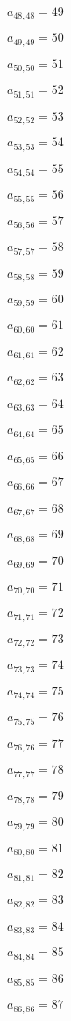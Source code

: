\documentclass[a4paper,12pt]{article}
\begin{document}
$a _{ 48, 48 } = 49$

$a _{ 49, 49 } = 50$

$a _{ 50, 50 } = 51$

$a _{ 51, 51 } = 52$

$a _{ 52, 52 } = 53$

$a _{ 53, 53 } = 54$

$a _{ 54, 54 } = 55$

$a _{ 55, 55 } = 56$

$a _{ 56, 56 } = 57$

$a _{ 57, 57 } = 58$

$a _{ 58, 58 } = 59$

$a _{ 59, 59 } = 60$

$a _{ 60, 60 } = 61$

$a _{ 61, 61 } = 62$

$a _{ 62, 62 } = 63$

$a _{ 63, 63 } = 64$

$a _{ 64, 64 } = 65$

$a _{ 65, 65 } = 66$

$a _{ 66, 66 } = 67$

$a _{ 67, 67 } = 68$

$a _{ 68, 68 } = 69$

$a _{ 69, 69 } = 70$

$a _{ 70, 70 } = 71$

$a _{ 71, 71 } = 72$

$a _{ 72, 72 } = 73$

$a _{ 73, 73 } = 74$

$a _{ 74, 74 } = 75$

$a _{ 75, 75 } = 76$

$a _{ 76, 76 } = 77$

$a _{ 77, 77 } = 78$

$a _{ 78, 78 } = 79$

$a _{ 79, 79 } = 80$

$a _{ 80, 80 } = 81$

$a _{ 81, 81 } = 82$

$a _{ 82, 82 } = 83$

$a _{ 83, 83 } = 84$

$a _{ 84, 84 } = 85$

$a _{ 85, 85 } = 86$

$a _{ 86, 86 } = 87$
\end{document}
